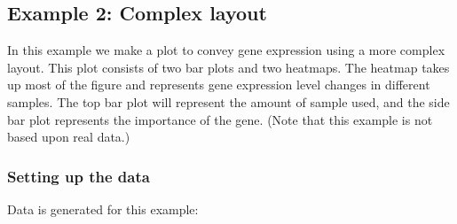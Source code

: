 \documentclass[letterpaper]{report}\usepackage[]{graphicx}\usepackage[]{color}
\begin{document}
\subsection{Example 2: Complex layout}

In this example we make a plot to convey gene expression using a more complex layout. This plot consists of two bar plots and two heatmaps. The heatmap takes up most of the figure and represents gene expression level changes in different samples. The top bar plot will represent the amount of sample used, and the side bar plot represents the importance of the gene. (Note that this example is not based upon real data.)

\subsubsection{Setting up the data}

Data is generated for this example: 
\end{document}
